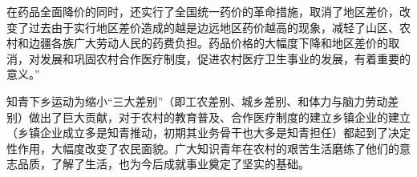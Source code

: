 \begin{maonote}
在药品全面降价的同时，还实行了全国统一药价的革命措施，取消了地区差价，改变了过去由于实行地区差价造成的越是边远地区药价越高的现象，减轻了山区、农村和边疆各族广大劳动人民的药费负担。药品价格的大幅度下降和地区差价的取消，对发展和巩固农村合作医疗制度，促进农村医疗卫生事业的发展，有着重要的意义。”

知青下乡运动为缩小“三大差别”（即工农差别、城乡差别、和体力与脑力劳动差别）做出了巨大贡献，对于农村的教育普及、合作医疗制度的建立乡镇企业的建立（乡镇企业成立多是知青推动，初期其业务骨干也大多是知青担任）都起到了决定性作用，大幅度改变了农民面貌。广大知识青年在农村的艰苦生活磨练了他们的意志品质，了解了生活，也为今后成就事业奠定了坚实的基础。
\end{maonote}
